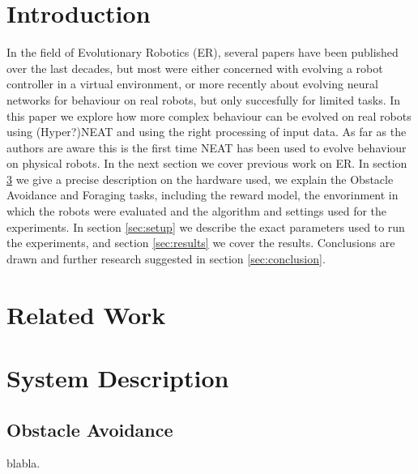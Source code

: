 \documentclass{article}
\begin{document}
	\maketitle
	\section{Introduction} %
	\label{sec:Introduction}
	In the field of Evolutionary Robotics (ER), several papers have been
	published over the last decades, but most were either concerned
	with evolving a robot controller in a virtual environment, or more recently
	about evolving neural networks for behaviour on real robots, but only
	succesfully for limited tasks.
	In this paper we explore how more complex behaviour can be evolved on real
	robots using (Hyper?)NEAT and using the right processing of input data. As
	far as the authors are aware this is the first time NEAT has been used to
	evolve behaviour on physical robots.
	In the next section we cover previous work on ER. In section
	\ref{sec:method} we give a precise description on the hardware used, we
	explain the Obstacle Avoidance and Foraging tasks, including the reward
	model, the envorinment in which the robots were evaluated and the algorithm
	and settings used for the experiments.
	In section \ref{sec:setup} we describe the exact parameters used to run the
	experiments, and section \ref{sec:results} we cover the results.
	Conclusions are drawn and further research suggested in section
	\ref{sec:conclusion}.

	\section{Related Work} %
	\label{sec:Related Work}
	\cite{heinermanevolution}
	\cite{silva2012odneat}
	\cite{stanley2002evolving, stanley2009hypercube, stanley2006real}

	\section{System Description} %
	\label{sec:method}
	\subsection{Obstacle Avoidance} %
	\label{sub:Obstacle Avoidance}
	blabla.
\end{document}
